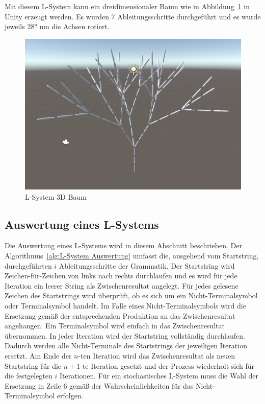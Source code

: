 Mit diesem L-System kann ein dreidimensionaler Baum wie in Abbildung~\ref{fig:L-System 3D Unity} in Unity erzeugt werden.
Es wurden 7 Ableitungsschritte durchgeführt und es wurde jeweils \ang{28} um die Achsen rotiert.

\begin{figure}[ht]
    \centering
    
    \includegraphics[width=0.5\linewidth]{chapters/02_Grundlagen/L_System/L_System_3D_Tree.png}
    \caption{L-System 3D Baum}\label{fig:L-System 3D Unity}
\end{figure}


\subsection{Auswertung eines L-Systems}
Die Auswertung eines L-Systems wird in diesem Abschnitt beschrieben.
Der Algorithmus~\ref{alg:L-System Auswertung} umfasst die, ausgehend vom Startstring, durchgeführten $i$ Ableitungsschritte der Grammatik.
Der Startstring wird Zeichen-für-Zeichen von links nach rechts durchlaufen und es wird für jede Iteration ein leerer String als Zwischenresultat angelegt.
Für jedes gelesene Zeichen des Startstrings wird überprüft, ob es sich um ein Nicht-Terminalsymbol oder Terminalsymbol handelt.
Im Falle eines Nicht-Terminalsymbols wird die Ersetzung gemäß der entsprechenden Produktion an das Zwischenresultat angehangen.
Ein Terminalsymbol wird einfach in das Zwischenresultat übernommen.
In jeder Iteration wird der Startstring vollständig durchlaufen.
Dadurch werden alle Nicht-Terminale des Startstrings der jeweiligen Iteration ersetzt.
Am Ende der $n$-ten Iteration wird das Zwischenresultat als neuen Startstring für die $n+1$-te Iteration gesetzt und der Prozess wiederholt sich für die festgelegten $i$ Iterationen.
Für ein stochastisches L-System muss die Wahl der Ersetzung in Zeile 6 gemäß der Wahrscheinlichkeiten für das Nicht-Terminalsymbol erfolgen.


